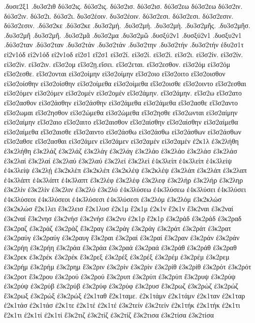 {.δυσε2ξ1
.δυ3σ2ιθ
δύ3σ2ις.  δύ3σ2ις.
δύ3σ2ισ.  δύ3σ2ισ.
δύ3σ2εω  δύ3σ2εω
δύ3σ2ιν.  δύ3σ2ιν.
δύ3σ2ι.  δύ3σ2ι.
δυ3σ2έοιν.  δυ3σ2έοιν.
δύ3σ2εσι.  δύ3σ2εσι.
δύ3σ2εσιν.  δύ3σ2εσιν.
.δύ3σ2κε  .δύ3σ2κε
.δυ3σ2μή.  .δυ3σ2μή.
.δυ3σ2μὴ.
.δυ3σ2μῆς.
.δυ3σ2μῆσ.
.δυ3σ2μῆ
.δυ3σ2μῆ.
.δυ3σ2μᾶ
.δυ3σ2μα
.δυ3σ2μῶ
.δυσξύ2ν1  .δυσξύ2ν1
.δυσξυ2ν1
.δύ3σ2ταν  .δύ3σ2ταν
.δυ3σ2τάν  .δυ3σ2τάν
.δυ3σ2την
.δυ3σ2τήν  .δυ3σ2τήν
ἐδυ2σ1τ
εἰ2ν1όδ  εἰ2ν1όδ
εἰ2ν1οδ
εἰ2σ1
εἴ2σ1
εἰ3σ2ί.  εἰ3σ2ί.
εἰ3σ2ὶ.
εἰ3σ2ι.
εἰ3σ2ίν.  εἰ3σ2ίν.
εἰ3σ2ὶν.
εἰ3σ2ιν.
εἴ3σ2ομ
εἴ3σ2ῃ.εἴσει.
εἴ3σ2εται.
εἴ3σ2εσθον.
εἰ3σ2όμ  εἰ3σ2όμ
εἴ3σ2εσθε.
εἴ3σ2ονται
εἰ3σ2οίμην  εἰ3σ2οίμην
εἴ3σ2οιο
εἴ3σ2οιτο
εἴ3σ2οισθον
εἰ3σ2οίσθην  εἰ3σ2οίσθην
εἰ3σ2οίμεθα  εἰ3σ2οίμεθα
εἴ3σ2οισθε
εἴ3σ2οιντο
εἴ3σ2εσθαι
εἰ3σ2όμεν  εἰ3σ2όμεν
εἰ3σ2ομέν  εἰ3σ2ομέν
εἴ3σ2άμην.  εἴ3σ2άμην.
εἴ3σ2ω
εἴ3σ2ατο
εἴ3σ2ασθον
εἰ3σ2άσθην  εἰ3σ2άσθην
εἰ3σ2άμεθα  εἰ3σ2άμεθα
εἴ3σ2ασθε
εἴ3σ2αντο
εἴ3σ2ωμαι
εἴ3σ2ησθον
εἰ3σ2ώμεθα  εἰ3σ2ώμεθα
εἴ3σ2ησθε
εἴ3σ2ωνται
εἰ3σ2αίμην  εἰ3σ2αίμην
εἴ3σ2αιο
εἴ3σ2αιτο
εἴ3σ2αισθον
εἴ3σ2αίσθην  εἴ3σ2αίσθην
εἰ3σ2αίμεθα  εἰ3σ2αίμεθα
εἴ3σ2αισθε
εἴ3σ2αιντο
εἰ3σ2άσθω  εἰ3σ2άσθω
εἰ3σ2άσθων  εἰ3σ2άσθων
εἴ3σ2αθσε
εἴ3σ2ασθαι
εἰ3σ2άμεν  εἰ3σ2άμεν
εἰ3σ2αμέν  εἰ3σ2αμέν
ἐ2κ1λ
ἐ3κ2λήθη  ἐ3κ2λήθη
ἐ3κ2λάζ  ἐ3κ2λάζ
ἐ3κ2λάγ  ἐ3κ2λάγ
ἐ3κ2λάο  ἐ3κ2λάο
ἐ3κ2λάσ  ἐ3κ2λάσ
ἐ3κ2λαί  ἐ3κ2λαί
ἐ3κ2λαύ  ἐ3κ2λαύ
ἐ3κ2λεί  ἐ3κ2λεί
ἐ4κ3λείπ  ἐ4κ3λείπ
ἐ4κ3λείψ  ἐ4κ3λείψ
ἐ3κ2λῄ
ἐ3κ2κλέπ  ἐ3κ2κλέπ
ἐ3κ2κλέψ  ἐ3κ2κλέψ
ἐ3κ2λάπ  ἐ3κ2λάπ
ἐ3κ2λαπ
ἐ4κ3λάπτ  ἐ4κ3λάπτ
ἐ4κ3λαπτ
ἐ3κ2λέφ  ἐ3κ2λέφ
ἐ3κ2λεφ
ἐ3κ2λήρ  ἐ3κ2λήρ
ἐ3κ2ληρ
ἐ3κ2λίν  ἐ3κ2λίν
ἐ3κ2λιν
ἐ3κ2λύ  ἐ3κ2λύ
ἐ4κ3λύσεω  ἐ4κ3λύσεω
ἐ4κ3λύσει  ἐ4κ3λύσει
ἐ4κ3λύσεοι  ἐ4κ3λύσεοι
ἐ4κ3λύσεσι  ἐ4κ3λύσεσι
ἐ3κ2λόμ  ἐ3κ2λόμ
ἐ3κ2κλώσ  ἐ3κ2κλώσ
ἔ2κ1λει
ἔ3κ2λεισ
ἔ2κ1λυσ
ἐ2κ1μ
ἔ2κ1μ
ἐ2κ1ν
ἔ2κ1ν
ἔ3κ2ναι
ἐ3κ2ναί  ἐ3κ2ναί
ἔ3κ2νησ
ἐ3κ2νήσ  ἐ3κ2νήσ
ἐ3κ2νυ
ἐ2κ1ρ
ἔ2κ1ρ
ἐ3κ2ράδ  ἐ3κ2ράδ
ἐ3κ2ραδ
ἔ3κ2ραζ
ἐ3κ2ράζ  ἐ3κ2ράζ
ἔ3κ2ραγ
ἐ3κ2ράγ  ἐ3κ2ράγ
ἐ3κ2ράτ  ἐ3κ2ράτ
ἐ3κ2ρατ
ἐ3κ2ραύγ  ἐ3κ2ραύγ
ἐ3κ2ραυγ
ἔ3κ2ραι
ἐ3κ2ραί  ἐ3κ2ραί
ἔ3κ2ραν
ἐ3κ2ράν  ἐ3κ2ράν
ἐ3κ2ρήη  ἐ3κ2ρήη
ἐ3κ2ράα  ἐ3κ2ράα
ἐ3κ2ραά  ἐ3κ2ραά
ἐ3κ2ράθ  ἐ3κ2ράθ
ἐ3κ2ραθ
ἔ3κ2ρεκ
ἐ3κ2ρέκ  ἐ3κ2ρέκ
ἔ3κ2ρεξ
ἐ3κ2ρέξ  ἐ3κ2ρέξ
ἐ3κ2ρέμ  ἐ3κ2ρέμ
ἐ3κ2ρεμ
ἐ3κ2ρήμ  ἐ3κ2ρήμ
ἐ3κ2ρημ
ἔ3κ2ριν
ἐ3κ2ρίν  ἐ3κ2ρίν
ἐ3κ2ρίθ  ἐ3κ2ρίθ
ἐ3κ2ρότ  ἐ3κ2ρότ
ἐ3κ2ροτ
ἔ3κ2ρου
ἐ3κ2ρού  ἐ3κ2ρού
ἔ3κ2ρυπ
ἐ3κ2ρύπ  ἐ3κ2ρύπ
ἔ3κ2ρυψ
ἐ3κ2ρύψ  ἐ3κ2ρύψ
ἐ3κ2ρύβ  ἐ3κ2ρύβ
ἐ3κ2ρύφ  ἐ3κ2ρύφ
ἐ3κ2ρυσ
ἔ3κ2ρωζ
ἐ3κ2ρώζ  ἐ3κ2ρώζ
ἔ3κ2ρωξ
ἐ3κ2ρώξ  ἐ3κ2ρώξ
ἐ2κ1ταθ
ἔ2κ1ταμε.
ἐ2κ1τάμν  ἐ2κ1τάμν
ἐ2κ1ταν
ἐ2κ1ταρ
ἐ2κ1τάσ  ἐ2κ1τάσ
ἐ2κ1τε
ἐ2κ1τέ  ἐ2κ1τέ
ἐ3κ2τείν  ἐ3κ2τείν
ἐ2κ1τήκ  ἐ2κ1τήκ
ἐ2κ1τι
ἔ2κ1τι
ἐ2κ1τί  ἐ2κ1τί
ἔ3κ2τιζ
ἐ3κ2τίζ  ἐ3κ2τίζ
ἔ3κ2τισα
ἐ3κ2τίσα  ἐ3κ2τίσα
}
